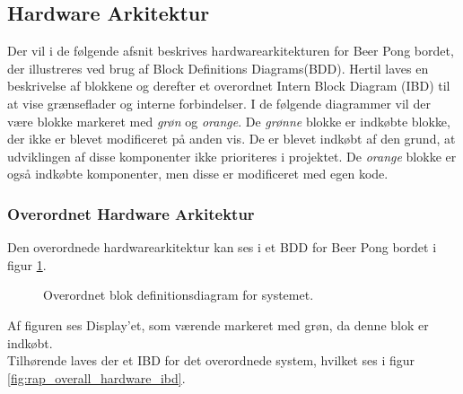 \documentclass[Rapport/Rapport_main.tex]{subfiles}
\begin{document}
\subsection{Hardware Arkitektur}
Der vil i de følgende afsnit beskrives hardwarearkitekturen for Beer Pong bordet, der illustreres ved brug af Block Definitions Diagrams(BDD). Hertil laves en beskrivelse af blokkene og derefter et overordnet Intern Block Diagram (IBD) til at vise grænseflader og interne forbindelser. I de følgende diagrammer vil der være blokke markeret med \textit{grøn} og \textit{orange}. De \textit{grønne} blokke er indkøbte blokke, der ikke er blevet modificeret på anden vis. De er blevet indkøbt af den grund, at udviklingen af disse komponenter ikke prioriteres i projektet. De \textit{orange} blokke er også indkøbte komponenter, men disse er modificeret med egen kode.
\subsubsection{Overordnet Hardware Arkitektur}
Den overordnede hardwarearkitektur kan ses i et BDD for Beer Pong bordet i figur \ref{fig:rap_overall_hardware_bdd}.

\begin{figure}[H]
    \centering
    \caption{Overordnet blok definitionsdiagram for systemet.}
    \label{fig:rap_overall_hardware_bdd}
\end{figure}
Af figuren ses Display'et, som værende markeret med grøn, da denne blok er indkøbt.\\
Tilhørende laves der et IBD for det overordnede system, hvilket ses i figur \ref{fig:rap_overall_hardware_ibd}.
\end{document}
